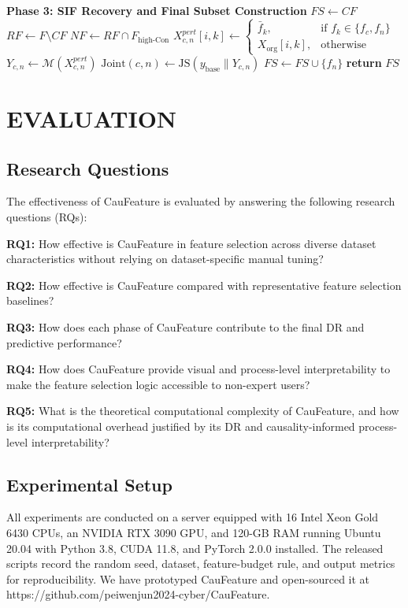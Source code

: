 \documentclass[journal]{IEEEtran}
\begin{document}
\begin{algorithm}[!t]
\begin{algorithmic}[1]
\STATE \textbf{Phase 3: SIF Recovery and Final Subset Construction}
\STATE $FS \leftarrow CF$
\STATE $RF \leftarrow F \setminus CF$
\STATE $NF \leftarrow RF \cap F_{\text{high-Con}}$
    \STATE $X^{pert}_{c,n}[i,k] \leftarrow \begin{cases} \bar{f}_k, & \text{if } f_k \in \{f_c, f_n\} \\ X_{\text{org}}[i,k], & \text{otherwise} \end{cases}$
    \STATE $Y_{c,n} \leftarrow \mathcal{M}(X^{pert}_{c,n})$
    \STATE $\text{Joint}(c,n) \leftarrow \text{JS}(y_{\text{base}} \parallel Y_{c,n})$
        \STATE $FS \leftarrow FS \cup \{f_n\}$ 
    \ENDIF
\ENDFOR
\STATE \textbf{return} $FS$
\end{algorithmic}
\end{algorithm}

\FloatBarrier
\section{EVALUATION}
\label{Evaluation}
\subsection{Research Questions}
The effectiveness of CauFeature is evaluated by answering the following research questions (RQs):

\textbf{RQ1:} How effective is CauFeature in feature selection across diverse dataset characteristics without relying on dataset-specific manual tuning?

\textbf{RQ2:} How effective is CauFeature compared with representative feature selection baselines?

\textbf{RQ3:} How does each phase of CauFeature contribute to the final DR and predictive performance?

\textbf{RQ4:} How does CauFeature provide visual and process-level interpretability to make the feature selection logic accessible to non-expert users?

\textbf{RQ5:} What is the theoretical computational complexity of CauFeature, and how is its computational overhead justified by its DR and causality-informed process-level interpretability?

\subsection{Experimental Setup}
All experiments are conducted on a server equipped with 16 Intel Xeon Gold 6430 CPUs, an NVIDIA RTX 3090 GPU, and 120-GB RAM running Ubuntu 20.04 with Python 3.8, CUDA 11.8, and PyTorch 2.0.0 installed. The released scripts record the random seed, dataset, feature-budget rule, and output metrics for reproducibility. We have prototyped CauFeature and open-sourced it at https://github.com/peiwenjun2024-cyber/CauFeature.
\end{document}
